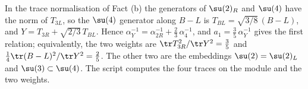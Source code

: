 In the trace normalisation of Fact (b) the generators of $\su(2)_{R}$ and $\su(4)$ have the norm of $T_{3L}$, so the $\su(4)$ generator along $B - L$ is $T_{BL} = \sqrt{3/8}\,(B - L)$, and $Y = T_{3R} + \sqrt{2/3}\,T_{BL}$. Hence $\alpha_{Y}^{-1} = \alpha_{2R}^{-1} + \tfrac23\,\alpha_{4}^{-1}$, and $a_{1} = \tfrac35\,\alpha_{Y}^{-1}$ gives the first relation; equivalently, the two weights are $\tr T_{3R}^{2}/\tr Y^{2} = \tfrac35$ and $\tfrac14\tr(B - L)^{2}/\tr Y^{2} = \tfrac25$. The other two are the embeddings $\su(2) = \su(2)_{L}$ and $\su(3) \subset \su(4)$. The script computes the four traces on the module and the two weights.
